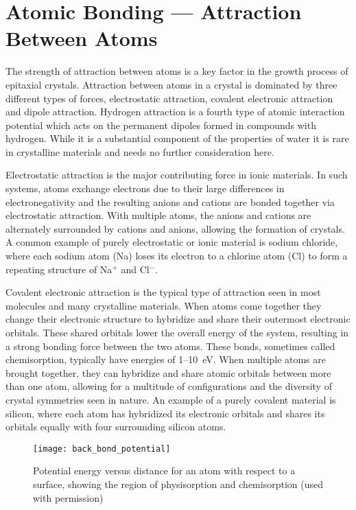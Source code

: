 \section{Atomic Bonding --- Attraction Between Atoms}
The strength of attraction between atoms is a key factor in the growth process of epitaxial crystals.
Attraction between atoms in a crystal is dominated by three different types of forces, electrostatic attraction, covalent electronic attraction and dipole attraction. Hydrogen attraction is a fourth type of atomic interaction potential which acts on the permanent dipoles formed in compounds with hydrogen.
While it is a substantial component of the properties of water it is rare in crystalline materials and needs no further consideration here.

Electrostatic attraction is the major contributing force in ionic materials.
In such systems, atoms exchange electrons due to their large differences in electronegativity and the resulting anions and cations are bonded together via electrostatic attraction.
With multiple atoms, the anions and cations are alternately surrounded by cations and anions, allowing the formation of crystals.
A common example of purely electrostatic or ionic material is sodium chloride, where each sodium atom (Na) loses its electron to a chlorine atom (Cl) to form a repeating structure of Na\(^+\) and Cl\(^-\).

Covalent electronic attraction is the typical type of attraction seen in most molecules and many crystalline materials.
When atoms come together they change their electronic structure to hybridize and share their outermost electronic orbitals.
These shared orbitals lower the overall energy of the system, resulting in a strong bonding force between the two atoms.
These bonds, sometimes called chemisorption, typically have energies of 1--10~eV\cite{oura2010surface}.
When multiple atoms are brought together, they can hybridize and share atomic orbitals between more than one atom, allowing for a multitude of configurations and the diversity of crystal symmetries seen in nature.
An example of a purely covalent material is silicon, where each atom has hybridized its electronic orbitals and shares its orbitals equally with four surrounding silicon atoms.
\begin{figure}
 \centering \texttt{[image: back\_bond\_potential]}
 \caption[Energy potentials between two atoms]{\label{fig:back_bond_potential}Potential energy versus distance for an atom with respect to a surface, showing the region of physisorption and chemisorption\cite{ohring2001materials} (used with permission)}
\end{figure}

